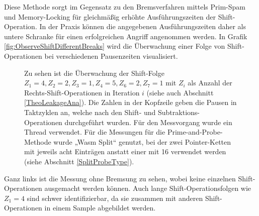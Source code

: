 
Diese Methode sorgt im Gegensatz zu den Bremsverfahren mittels Prim-Spam und Memory-Locking für gleichmäßig erhöhte Ausführungszeiten der Shift-Operation.
In der Praxis können die angegebenen Ausführungszeiten daher als untere Schranke für einen erfolgreichen Angriff angenommen werden.
In Grafik \ref{fig:ObserveShiftDifferentBreaks} wird die Überwachung einer Folge von Shift-Operationen bei verschiedenen Pausenzeiten visualisiert.

\label{fig:ObserveShiftDifferentBreaks}
\begin{figure}[h]
\centering
\begin{scaletikzpicturetowidth}{\textwidth}

\end{scaletikzpicturetowidth}
\caption{Zu sehen ist die Überwachung der Shift-Folge $Z_1=4,Z_2=2,Z_3=1,Z_4=5,Z_6=2,Z_7=1$ mit $Z_i$ als Anzahl der Rechts-Shift-Operationen in Iteration $i$ (siehe auch Abschnitt \ref{TheoLeakageAna}). Die Zahlen in der Kopfzeile geben die Pausen in Taktzyklen an, welche nach den Shift- und Subtraktions-Operationen durchgeführt wurden. Für den Messvorgang wurde ein Thread verwendet. Für die Messungen für die Prime-and-Probe-Methode wurde „Wasm Split“ genutzt, bei der zwei Pointer-Ketten mit jeweils acht Einträgen anstatt einer mit 16 verwendet werden (siehe Abschnitt \ref{SplitProbeType}).}
\end{figure}

Ganz links ist die Messung ohne Bremsung zu sehen, wobei keine einzelnen Shift-Operationen ausgemacht werden können. Auch lange Shift-Operationsfolgen wie $Z_1 = 4$ sind schwer identifizierbar, da sie zusammen mit anderen Shift-Operationen in einem Sample abgebildet werden.

